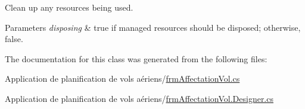 Clean up any resources being used. 


\begin{DoxyParams}{Parameters}
{\em disposing} & true if managed resources should be disposed; otherwise, false.\\
\hline
\end{DoxyParams}


The documentation for this class was generated from the following files\+:\begin{DoxyCompactItemize}
\item 
Application de planification de vols aériens/\hyperlink{frm_affectation_vol_8cs}{frm\+Affectation\+Vol.\+cs}\item 
Application de planification de vols aériens/\hyperlink{frm_affectation_vol_8_designer_8cs}{frm\+Affectation\+Vol.\+Designer.\+cs}\end{DoxyCompactItemize}

